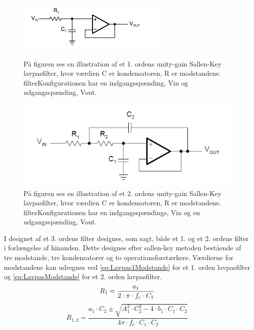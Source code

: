 \begin{figure}[H]
	\centering
	\begin{minipage}[b]{0.45\textwidth}
		\includegraphics[width=\textwidth]{figures/cProblemloesning/Lavpasfilter1_teoretisk.PNG}
		\caption{På figuren ses en illustration af et 1. ordens unity-gain Sallen-Key lavpasfilter, hvor værdien C er kondensatoren, R er modstandene. filterKonfigurationen har en indgangsspænding, Vin og udgangsspænding, Vout. \citep{Carter2013}}
		\label{fig:SallenKey1}
	\end{minipage}
	\hfill
	\begin{minipage}[b]{0.45\textwidth}
		\includegraphics[width=\textwidth]{figures/cProblemloesning/Sallenlavpas.PNG}
		\caption{På figuren ses en illustration af et 2. ordens unity-gain Sallen-Key lavpasfilter, hvor værdien C er kondensatoren, R er modstandene. filterKonfigurationen har en indgangsspændings, Vin og en udgangsspænding, Vout. \citep{Carter2013}}
		\label{fig:SallenKey2}
	\end{minipage}
\end{figure}

I designet af et 3. ordens filter designes, som sagt, både et 1. og et 2. ordens filter i forlængelse af hinanden. Dette designes efter sallen-key metoden bestående af tre modstande, tre kondensatorer og to operationsforstærkere. Værdierne for modstandene kan udregnes ved \eqref{eq:Lavpas1Modstande} for et 1. orden lavpasfilter og \eqref{eq:LavpasModstande} for et  2. orden lavpasfilter.  
\begin{equation} \label{eq:Lavpas1Modstande}
R_{1} = \frac{a_1}{2 \cdot \pi \cdot f_c \cdot C_1} \\
\end{equation}
\begin{equation}
 \label{eq:LavpasModstande}
R_{1,2} = \frac{a_1 \cdot C_2 \pm \sqrt{A_1^2 \cdot C_2^2 - 4 \cdot b_1 \cdot C_1 \cdot C_2}}{4 \pi \cdot f_c \cdot C_1 \cdot C_2}
\end{equation}

